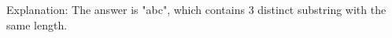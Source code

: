 \documentclass[preview]{standalone}
\begin{document}
Explanation: The answer is "abc", which contains 3 distinct substring with the same length.\\
\end{document}
